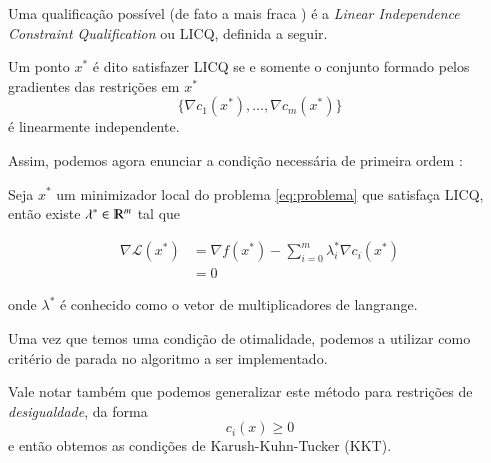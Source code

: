 Uma qualificação possível (de fato a mais fraca \citep{Wachsmuth201378}) é a
\emph{Linear Independence Constraint Qualification} ou LICQ, definida a seguir.

\begin{definition}
    Um ponto $x^*$ é dito satisfazer LICQ se e somente o conjunto formado pelos
    gradientes das restrições em $x^*$
    $$ \{ \nabla c_1(x^*), \dots, \nabla c_m(x^*)\} $$
    é linearmente independente.
\end{definition}

Assim, podemos agora enunciar a condição necessária de primeira ordem \citep{Friedlander94}:

\begin{theorem}
    Seja $x^*$ um minimizador local do problema \ref{eq:problema} que satisfaça LICQ,
    então existe $\lambda^* \in \varmathbb{R}^m$ tal que

    \begin{equation}
        \label{eq:parada}
        \begin{aligned}
            \nabla \mathcal{L}(x^*) &= \nabla f(x^*) - \sum_{i = 0}^{m} \lambda_i^* \nabla c_i(x^*) \\
                                  &= 0
        \end{aligned}
    \end{equation}

    onde $\lambda^*$ é conhecido como o vetor de multiplicadores de langrange.
\end{theorem}

Uma vez que temos uma condição de otimalidade, podemos a utilizar como critério
de parada no algoritmo a ser implementado.

Vale notar também que podemos generalizar este método para restrições de \emph{desigualdade},
da forma
$$ c_i(x) \geq 0 $$
e então obtemos as condições de Karush-Kuhn-Tucker (KKT). \citep{Nocedal2006NO}
